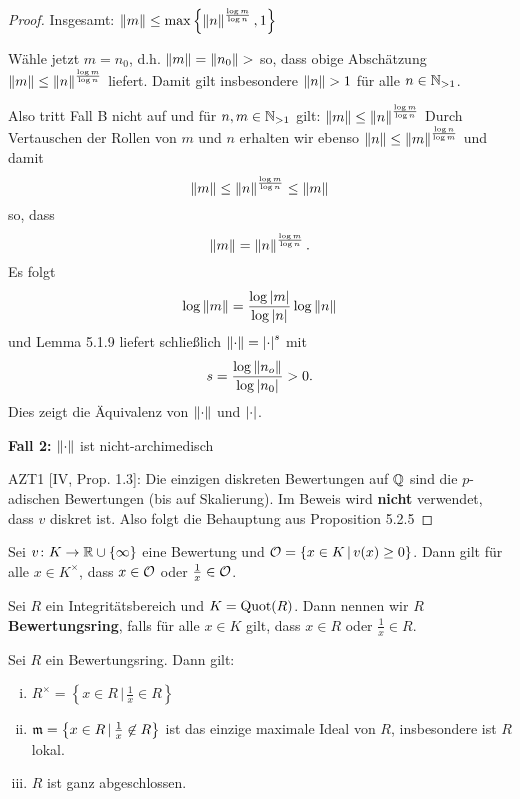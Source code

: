 \begin{proof}
\bigskip Insgesamt: $\left\|{m}\right\| \leq \max \left\{  \left\|{n}\right\|^{ \frac{\log m}{\log n} }, 1  \right\}$

Wähle jetzt $m =n_0$, d.h. $\norm{m} = \norm{n_0}>$ so, dass obige Abschätzung
$\left\|{m}\right\| \leq \left\|{n}\right\|^{ \frac{\log m}{\log n} }$ liefert. Damit gilt insbesondere $\norm{n}>1$ für alle $n \in \mathbb{N}_{>1}$.

Also tritt Fall B nicht auf und für $n,m \in \mathbb{N}_{>1}$ gilt: $\left\|{m}\right\| \leq \left\|{n}\right\|^{ \frac{\log m}{\log n} }$ 
Durch Vertauschen der Rollen von $m$ und $n$ erhalten wir ebenso 
$\left\|{n}\right\| \leq \left\|{m}\right\|^{ \frac{\log n}{\log m} }$ und damit
\[ \left\|{m}\right\| \leq \left\|{n}\right\|^{ \frac{\log m}{\log n} } \leq \left\|{m}\right\|
\]
so, dass
\[ \left\|{m}\right\| =\left\|{n}\right\|^{ \frac{\log m}{\log n} }.
\]
Es folgt
\[ \log\left\|{m}\right\| =\frac{\log\left|{m}\right|}{\log\left|{n}\right|} \log\left\|{n}\right\|
\]
und Lemma 5.1.9 liefert schließlich $\left\|{\cdot}\right\| = \left|{\cdot}\right|^s$ mit
\[ s = \frac{\log\left\|{n_o}\right\|}{\log\left|{n_0}\right|} > 0.
\]
Dies zeigt die Äquivalenz von $\left\|{\cdot}\right\|$ und $\left|{\cdot}\right|$.

\bigskip \textbf{Fall 2:} $\left\|{\cdot}\right\|$ ist nicht-archimedisch

AZT1 [IV, Prop. 1.3]: Die einzigen diskreten Bewertungen auf $\mathbb{Q}$ sind die $p$-adischen Bewertungen (bis auf Skalierung). Im Beweis wird \textbf{nicht} verwendet, dass $v$ diskret ist.
Also folgt die Behauptung aus Proposition 5.2.5
\end{proof}


\begin{Bem}
Sei $v\colon K \to \mathbb{R} \cup \{\infty \} $ eine Bewertung und
$\mathcal{O} = \{ x \in K \, | \, v(x) \geq 0 \}$. Dann gilt für alle $x \in K^\times$, dass $x \in \mathcal{O}$ oder $\frac{1}{x} \in \mathcal{O}$.
\end{Bem}


\begin{defi}
Sei $R$ ein Integritätsbereich und $K = \operatorname{Quot}(R)$. Dann nennen wir $R$ \textbf{Bewertungsring}, falls
für alle $x \in K$ gilt, dass $x \in R$ oder $\frac{1}{x} \in R$.
\end{defi}

\begin{Prop}
Sei $R$ ein Bewertungsring. Dann gilt:
\begin{enumerate}[(i)]
\item $R^\times = \left\{ x \in R \, | \, \frac{1}{x} \in R \right\}$
\item $\mathfrak{m} = \left\{ x \in R \, | \, \frac{1}{x} \not\in R \right\}$ ist das einzige maximale Ideal von $R$, insbesondere ist $R$ lokal.
\item $R$ ist ganz abgeschlossen.
\end{enumerate}
\end{Prop}

